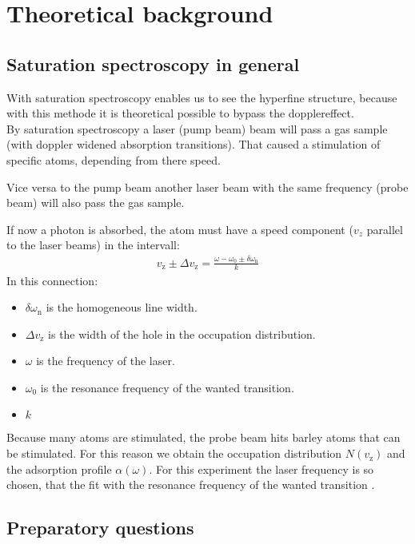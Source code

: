 \chapter{Theoretical background}

\section{Saturation spectroscopy in general}
With saturation spectroscopy enables us to see the hyperfine structure, because with this methode it is theoretical possible to bypass the dopplereffect. \\
By saturation spectroscopy a laser (pump beam) beam will pass a gas sample (with doppler widened absorption transitions). That caused a stimulation of specific atoms, depending from there speed. 

Vice versa to the pump beam another laser beam with the same frequency (probe beam) will also pass the gas sample.

If now a photon is absorbed, the atom must have a speed component ($v_z$ parallel to the laser beams) in the intervall: 
\begin{align}
    v_{\text{z}} \pm \Delta v_{\text{z}} = \frac{\omega -\omega_0 \pm \delta \omega_{\text{n}}}{k}
\end{align}
In this connection: 
\begin{itemize} 
    \item $\delta \omega_{\text{n}}$ is the homogeneous line width.
    \item $\Delta v_{\text{z}}$ is the width of the hole in the occupation distribution.
    \item $\omega$ is the frequency of the laser.
    \item $\omega_0$ is the resonance frequency of the wanted transition.
    \item $k$ 
\end{itemize}

Because many atoms are stimulated, the probe beam hits barley atoms that can be stimulated. For this reason we obtain the occupation distribution $N(v_{\text{z}})$ and the adsorption profile $\alpha(\omega)$. For this experiment the laser frequency is so chosen, that the fit with the resonance frequency of the wanted transition \citep{VA00}.

\section{Preparatory questions}

